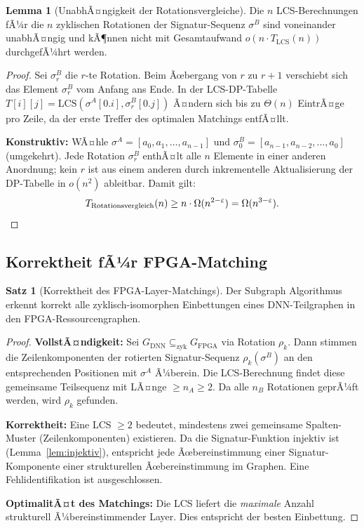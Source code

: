 ﻿\documentclass[a4paper,12pt]{article}
\theoremstyle{definition}
\newtheorem{satz}{Satz}
\newtheorem{lemma}{Lemma}
\begin{document}
\begin{lemma}[UnabhÃ¤ngigkeit der Rotationsvergleiche]
\label{lem:rotation_independent}
    Die $n$ LCS-Berechnungen fÃ¼r die $n$ zyklischen Rotationen der Signatur-Sequenz $\sigma^B$
    sind voneinander unabhÃ¤ngig und kÃ¶nnen nicht mit Gesamtaufwand $o(n \cdot T_{\text{LCS}}(n))$
    durchgefÃ¼hrt werden.
\end{lemma}

\begin{proof}
    Sei $\sigma^B_r$ die $r$-te Rotation. Beim Ãœbergang von $r$ zu $r+1$ verschiebt sich
    das Element $\sigma_r^B$ vom Anfang ans Ende. In der LCS-DP-Tabelle
    $T[i][j] = \text{LCS}(\sigma^A[0.i], \sigma^B_r[0.j])$ Ã¤ndern sich bis zu $\Theta(n)$
    EintrÃ¤ge pro Zeile, da der erste Treffer des optimalen Matchings entfÃ¤llt.
    
    \textbf{Konstruktiv:} WÃ¤hle $\sigma^A = [a_0, a_1, \ldots, a_{n-1}]$ und
    $\sigma^B_0 = [a_{n-1}, a_{n-2}, \ldots, a_0]$ (umgekehrt). Jede Rotation $\sigma^B_r$
    enthÃ¤lt alle $n$ Elemente in einer anderen Anordnung; kein $r$ ist aus einem anderen
    durch inkrementelle Aktualisierung der DP-Tabelle in $o(n^2)$ ableitbar.
    Damit gilt:
    \[
        T_{\text{Rotationsvergleich}}(n) \geq n \cdot \Omega(n^{2-\varepsilon}) = \Omega(n^{3-\varepsilon}). \qedhere
    \]
\end{proof}

\subsection{Korrektheit fÃ¼r FPGA-Matching}

\begin{satz}[Korrektheit des FPGA-Layer-Matchings]
\label{satz:korrektheit}
    Der Subgraph Algorithmus erkennt korrekt alle zyklisch-isomorphen Einbettungen
    eines DNN-Teilgraphen in den FPGA-Ressourcengraphen.
\end{satz}

\begin{proof}
    \textbf{VollstÃ¤ndigkeit:} Sei $G_{\text{DNN}} \subseteq_{\text{zyk}} G_{\text{FPGA}}$
    via Rotation $\rho_k$. Dann stimmen die Zeilenkomponenten der rotierten Signatur-Sequenz
    $\rho_k(\sigma^B)$ an den entsprechenden Positionen mit $\sigma^A$ Ã¼berein.
    Die LCS-Berechnung findet diese gemeinsame Teilsequenz mit LÃ¤nge $\geq n_A \geq 2$.
    Da alle $n_B$ Rotationen geprÃ¼ft werden, wird $\rho_k$ gefunden.
    
    \textbf{Korrektheit:} Eine LCS $\geq 2$ bedeutet, mindestens zwei gemeinsame Spalten-Muster
    (Zeilenkomponenten) existieren. Da die Signatur-Funktion injektiv ist (Lemma~\ref{lem:injektiv}),
    entspricht jede Ãœbereinstimmung einer Signatur-Komponente einer strukturellen Ãœbereinstimmung
    im Graphen. Eine Fehlidentifikation ist ausgeschlossen.
    
    \textbf{OptimalitÃ¤t des Matchings:} Die LCS liefert die \emph{maximale} Anzahl
    strukturell Ã¼bereinstimmender Layer. Dies entspricht der besten Einbettung. \qedhere
\end{proof}
\end{document}

